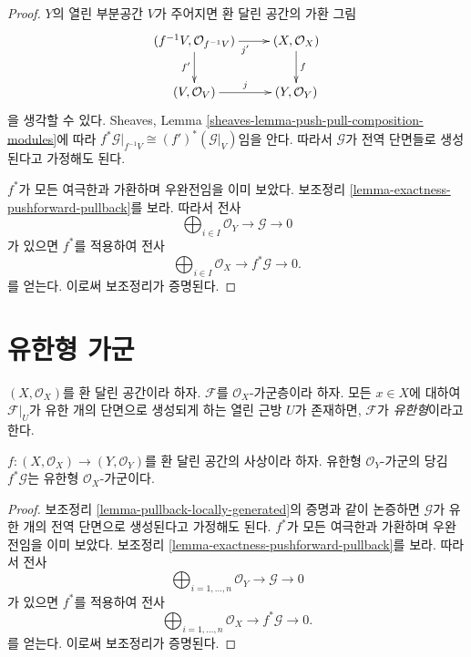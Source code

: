 \begin{proof}
$Y$의 열린 부분공간 $V$가 주어지면 환 달린 공간의 가환 그림
$$
\xymatrix{
(f^{-1}V, \mathcal{O}_{f^{-1}V}) \ar[r]_{j'} \ar[d]_{f'} &
(X, \mathcal{O}_X) \ar[d]^f \\
(V, \mathcal{O}_V) \ar[r]^j &
(Y, \mathcal{O}_Y)
}
$$
을 생각할 수 있다. Sheaves, Lemma
\ref{sheaves-lemma-push-pull-composition-modules}에 따라
$f^*\mathcal{G}|_{f^{-1}V} \cong (f')^*(\mathcal{G}|_V)$임을 안다.
따라서 $\mathcal{G}$가 전역 단면들로 생성된다고 가정해도 된다.

\medskip\noindent
$f^*$가 모든 여극한과 가환하며 우완전임을 이미 보았다.
보조정리 \ref{lemma-exactness-pushforward-pullback}를 보라.
따라서 전사
$$
\bigoplus\nolimits_{i \in I}
\mathcal{O}_Y
\to
\mathcal{G}
\to
0
$$
가 있으면 $f^*$를 적용하여 전사
$$
\bigoplus\nolimits_{i \in I}
\mathcal{O}_X
\to
f^*\mathcal{G}
\to
0.
$$
를 얻는다. 이로써 보조정리가 증명된다.
\end{proof}












\section{유한형 가군}
\label{section-finite-type}

\begin{definition}
\label{definition-finite-type}
$(X, \mathcal{O}_X)$를 환 달린 공간이라 하자.
$\mathcal{F}$를 $\mathcal{O}_X$-가군층이라 하자.
모든 $x \in X$에 대하여 $\mathcal{F}|_U$가 유한 개의 단면으로 생성되게 하는
열린 근방 $U$가 존재하면, $\mathcal{F}$가 {\it 유한형}이라고 한다.
\end{definition}

\begin{lemma}
\label{lemma-pullback-finite-type}
$f : (X, \mathcal{O}_X) \to (Y, \mathcal{O}_Y)$를
환 달린 공간의 사상이라 하자.
유한형 $\mathcal{O}_Y$-가군의 당김 $f^*\mathcal{G}$는
유한형 $\mathcal{O}_X$-가군이다.
\end{lemma}

\begin{proof}
보조정리 \ref{lemma-pullback-locally-generated}의 증명과 같이 논증하면
$\mathcal{G}$가 유한 개의 전역 단면으로 생성된다고 가정해도 된다.
$f^*$가 모든 여극한과 가환하며 우완전임을 이미 보았다.
보조정리 \ref{lemma-exactness-pushforward-pullback}를 보라.
따라서 전사
$$
\bigoplus\nolimits_{i = 1, \ldots, n}
\mathcal{O}_Y
\to
\mathcal{G}
\to
0
$$
가 있으면 $f^*$를 적용하여 전사
$$
\bigoplus\nolimits_{i = 1, \ldots, n}
\mathcal{O}_X
\to
f^*\mathcal{G}
\to
0.
$$
를 얻는다. 이로써 보조정리가 증명된다.
\end{proof}

